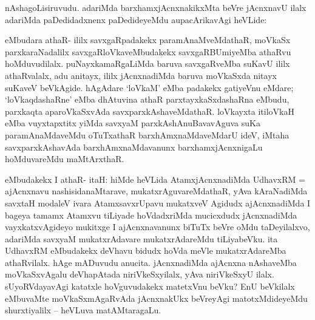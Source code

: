 \begin{artha}
nAshagoLisiruvudu. adariMda barxhamxjAcnxnakikxMta beVre jAcnxnavU ilalx adariMda paDedidadxnenx paDedideyeMdu aupacArikavAgi heVLide:
\end{artha}


\begin{artha}
eMbudara athaR- ililx savxgaRpadakekx paramAnaMveMdathaR, moVkaSx parxkaraNadalilx savxgaRloVkaveMbudakekx savxgaRBUmiyeMba athaRvu hoMduvudilalx. puNayxkamaRgaLiMda baruva savxgaRveMba suKavU ililx athaRvalalx, adu anitayx, ililx jAcnxnadiMda baruva moVkaSxda nitayx suKaveV beVkAgide. hAgAdare `loVkaM' eMba padakekx gatiyeVnu eMdare; `loVkaqdashaRne' eMba dhAtuvina athaR parxtayxkaSxdashaRna eMbudu, parxkaqta aparoVkaSxvAda savxparxkAshaveMdathaR. loVkayxta itiloVkaH eMba vuyxtapxtitx yiMda savxyaM parxkAshAnuBavavAguva suKa paramAnaMdaveMdu oTuTxathaR barxhAmxnaMdaveMdarU ideV, iMtaha savxparxkAshavAda barxhAmxnaMdavanunx barxhamxjAcnxnigaLu hoMduvareMdu maMtArxthaR. 
\end{artha}


\begin{artha}
eMbudakekx I athaR- itaH: hiMde heVLida AtamxjAcnxnadiMda UdhavxRM = ajAcnxnavu nashisidanaMtarave, mukatxrAguvareMdathaR, yAva kAraNadiMda savxtaH modaleV ivara AtamxsavxrUpavu mukatxveV Agidudx ajAcnxnadiMda I bageya tamamx Atamxvu tiLiyade hoVdadxriMda mucicxdudx jAcnxnadiMda vayxkatxvAgideyo mukitxge I ajAcnxnavanunx biTuTx beVre oMdu taDeyilalxvo, adariMda savxyaM mukatxrAdavare mukatxrAdareMdu tiLiyabeVku. ita UdhavxRM eMbudakekx deVhavu bidudx hoVda meVle mukatxrAdareMba athaRvilalx. hAge mADuvudu anucita. jAcnxnadiMda ajAcnxna nAshaveMba moVkaSxvAgalu deVhapAtada niriVkeSxyilalx, yAva niriVkeSxyU ilalx. sUyoRVdayavAgi katatxle hoVguvudakekx matetxVnu beVku? EnU beVkilalx eMbuvaMte moVkaSxmAgaRvAda jAcnxnakUkx beVreyAgi matotxMdideyeMdu shurxtiyalilx {\rm --} heVLuva matAMtaragaLu.
\end{artha}


